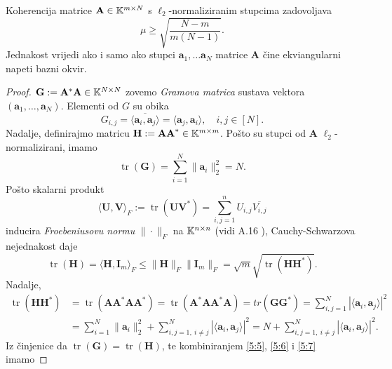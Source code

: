 \documentclass[a4paper,twoside,12pt]{memoir} %
\newcommand{\vect}[1]{\mathbf{#1}}
\renewcommand{\vec}{\vect}
\newcommand{\norm}[1]{\|{#1}\|}
\DeclareMathOperator{\tr}{tr}
\begin{document}
\begin{thm}\label{tm:5:7}
    Koherencija matrice $\vec A \in \K^{m \times N}$ s $\ell_2$-normaliziranim stupcima zadovoljava 
    \begin{equation}\label{5:4}
        \mu \geq \sqrt{\frac{N-m}{m(N-1)}}. 
    \end{equation}
    Jednakost vrijedi ako i samo ako stupci $\vec a_1, \dots \vec a_N$ matrice $\vec A$ \v{c}ine ekviangularni napeti bazni okvir.
\end{thm}
\begin{proof}
    $\vec G := \vec A^* \vec A \in \K^{N \times N}$ zovemo \textit{Gramova matrica} sustava vektora $(\vec a_1, \dots, \vec a_N)$. Elementi od $G$ su obika
    \begin{equation*}
        G_{i,j} = \overline{ \langle \vec a_i, \vec a_j \rangle}  =  \langle \vec a_j, \vec a_i \rangle, \quad i,j \in [N].
    \end{equation*}
    Nadalje, definirajmo matricu $\vec H := \vec{AA}^* \in \K^{m \times m}$. Po\v{s}to su stupci od $\vec A$ $\ell_2$-normalizirani, imamo
    \begin{equation}\label{5:5}
        \tr(\vec G) = \sum_{i = 1}^{N} \norm{\vec a_i}_2^2 = N.
    \end{equation}
    Po\v{s}to skalarni produkt
    \begin{equation*}
        \langle \vec U, \vec V \rangle_F := \tr(\vec{UV}^*) = \sum_{i,j = 1}^{n} U_{i,j}\overline{V_{i,j}}
    \end{equation*}
    inducira \textit{Froebeniusovu normu} $\norm{ \cdot }_F$ na $\mathbb{K}^{n \times n}$ (vidi A.16 \cite{foucart13}), Cauchy-Schwarzova nejednakost daje
    \begin{equation}\label{5:6}
        \tr(\vec H) = \langle \vec H, \vec I_m \rangle_F \leq \norm{\vec H}_F \norm{\vec I_m}_F = \sqrt{m} \sqrt{\tr(\vec{HH}^*)}.
    \end{equation}
    Nadalje,
    \begin{align}\label{5:7}
        \tr(\vec{HH}^*) &= \tr(\vec{AA}^* \vec{AA}^*) = \tr(\vec A^* \vec{AA}^* \vec A) = tr(\vec{GG}^*) = \sum_{i,j = 1}^N |\langle \vec a_i, \vec a_j \rangle|^2\nonumber\\ 
        &= \sum_{i=1}^N \norm{\vec a_i}_2^2 + \sum_{i,j = 1,\ i \neq j}^N |\langle \vec a_i, \vec a_j \rangle|^2 = N + \sum_{i,j = 1,\ i \neq j}^N |\langle \vec a_i, \vec a_j \rangle|^2.
    \end{align}
    Iz \v{c}injenice da $\tr(\vec G) = \tr(\vec H)$, te kombiniranjem \eqref{5:5}, \eqref{5:6} i \eqref{5:7} imamo

\end{proof}
\end{document}
